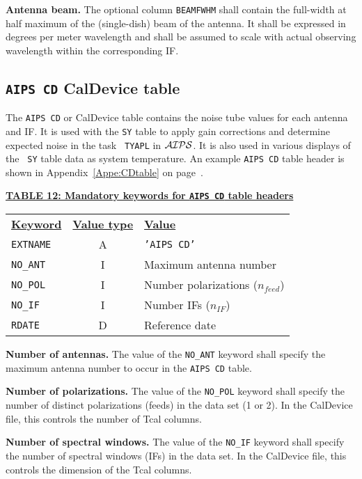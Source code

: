 \documentclass[twoside]{article}
\newcommand{\AIPS}{{$\cal AIPS\/$}}
\newcommand{\npol}{$n_{feed}$}
\newcommand{\nif}{$n_{IF}$}
\begin{document}
{\bf Antenna beam.} The optional column {\tt BEAMFWHM} shall contain
the full-width at half maximum of the (single-dish) beam of the
antenna.  It shall be expressed in degrees per meter wavelength and
shall be assumed to scale with actual observing wavelength within the
corresponding IF.

\subsection{{\tt AIPS CD} CalDevice table}
\label{s:CD}

The {\tt AIPS CD} or CalDevice table contains the noise tube values
for each antenna and IF\@.  It is used with the {\tt SY} table to
apply gain corrections and determine expected noise in the task {\tt
TYAPL} in \AIPS\@.  It is also used in various displays of the {\tt
SY} table data as system temperature.  An example {\tt AIPS CD} table
header is shown in Appendix~\ref{Appe:CDtable} on
page~\pageref{Appe:CDtable}.

\begin{center}
\underline{\bf{TABLE 12: Mandatory keywords for {\tt AIPS CD} table
    headers}}\\
\begin{tabular}{lcl}
\noalign{\vspace{2pt}} \label{ta:CDkeys}
\underline{{\bf Keyword}} & \underline{\bf{Value type}} &
    \underline{\bf{Value\vphantom{y}}} \\
\noalign{\vspace{2pt}}
{\tt EXTNAME}   & A & {\tt 'AIPS CD'}  \\
{\tt NO\_ANT}   & I & Maximum antenna number \\
{\tt NO\_POL}   & I & Number polarizations (\npol) \\
{\tt NO\_IF}    & I & Number IFs (\nif) \\
{\tt RDATE}     & D & Reference date
\end{tabular}
\end{center}

{\bf Number of antennas.} The value of the {\tt NO\_ANT} keyword shall
specify the maximum antenna number to occur in the {\tt AIPS CD} table.

{\bf Number of polarizations.} The value of the {\tt NO\_POL}
keyword shall specify the number of distinct polarizations (feeds) in
the data set (1 or 2).  In the CalDevice file, this controls the
number of Tcal columns.

{\bf Number of spectral windows.} The value of the {\tt NO\_IF}
keyword shall specify the number of spectral windows (IFs) in the data
set.  In the CalDevice file, this controls the dimension of the
Tcal columns.
\end{document}
